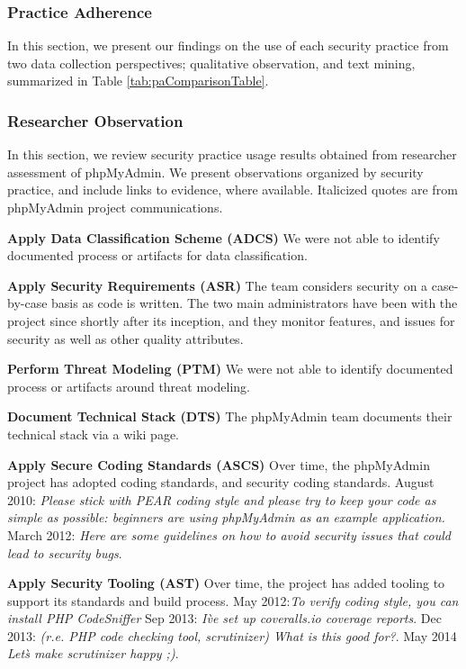 \subsubsection{Practice Adherence}

In this section, we present our findings on the use of each security practice from two data collection perspectives; qualitative observation, and text mining, summarized in Table \ref{tab:paComparisonTable}.

\subsubsection{Researcher Observation}

In this section, we review security practice usage results obtained from researcher assessment of phpMyAdmin. We present observations organized by security practice, and include links to evidence, where available. Italicized quotes are from phpMyAdmin project communications.

\textbf{Apply Data Classification Scheme (ADCS)}
We were not able to identify documented process or artifacts for data classification.

\textbf{Apply Security Requirements (ASR)}
The team considers security on a case-by-case basis as code is written. The two main administrators have been with the project since shortly after its inception, and they monitor features, and issues for security as well as other quality attributes.

\textbf{Perform Threat Modeling (PTM)}
We were not able to identify documented process or artifacts around threat modeling. 

\textbf{Document Technical Stack (DTS)}
The phpMyAdmin team documents their technical stack via a wiki page.

\textbf{Apply Secure Coding Standards (ASCS)}
Over time, the phpMyAdmin project has adopted coding standards, and security coding standards. August 2010: \textit{Please stick with PEAR coding style and please try to keep your code as simple as possible: beginners are using phpMyAdmin as an example application.}  March 2012: \textit{Here are some guidelines on how to avoid security issues that could lead to security bugs}.

\textbf{Apply Security Tooling (AST)}
Over time, the project has added tooling to support its standards and build process. May 2012:\textit{To verify coding style, you can install PHP CodeSniffer}  Sep 2013: \textit{I\`ve set up coveralls.io coverage reports}. Dec 2013: \textit{(r.e. PHP code checking tool, scrutinizer) What is this good for?}. May 2014 \textit{Let\`s make scrutinizer happy ;)}. 

